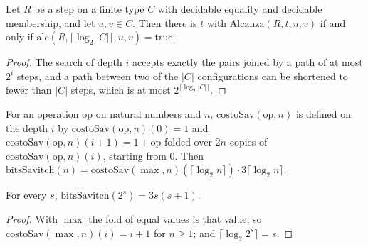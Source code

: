 \begin{theorem}
  \label{thm:machines-savitch}
  \leanok
  Let $R$ be a step on a finite type $C$ with decidable equality and decidable membership, and let
  $u, v \in C$. Then there is $t$ with $\mathrm{Alcanza}(R, t, u, v)$ if and only if
  $\mathrm{alc}(R, \lceil \log_2 |C| \rceil, u, v) = \mathrm{true}$.
\end{theorem}

\begin{proof}
  \leanok
  The search of depth $i$ accepts exactly the pairs joined by a path of at most $2^i$ steps, and a path
  between two of the $|C|$ configurations can be shortened to fewer than $|C|$ steps, which is at most
  $2^{\lceil \log_2 |C| \rceil}$.
\end{proof}

\begin{definition}
  \label{def:machines-savitch-cost}
  \leanok
  For an operation $\mathrm{op}$ on natural numbers and $n$, $\mathrm{costoSav}(\mathrm{op}, n)$ is defined on
  the depth $i$ by $\mathrm{costoSav}(\mathrm{op}, n)(0) = 1$ and
  $\mathrm{costoSav}(\mathrm{op}, n)(i + 1) = 1 + \mathrm{op}$ folded over $2n$ copies of
  $\mathrm{costoSav}(\mathrm{op}, n)(i)$, starting from $0$. Then
  $\mathrm{bitsSavitch}(n) = \mathrm{costoSav}(\max, n)(\lceil \log_2 n \rceil) \cdot 3 \lceil \log_2 n \rceil$.
  \own{}
  \infrastructure{}
\end{definition}

\begin{theorem}
  \label{thm:machines-savitch-bits}
  \leanok
  For every $s$, $\mathrm{bitsSavitch}(2^s) = 3 s (s + 1)$.
\end{theorem}

\begin{proof}
  \leanok
  With $\max$ the fold of equal values is that value, so $\mathrm{costoSav}(\max, n)(i) = i + 1$ for
  $n \ge 1$; and $\lceil \log_2 2^s \rceil = s$.
\end{proof}

